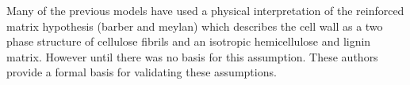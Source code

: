 Many of the previous models have used a physical interpretation of the
reinforced matrix hypothesis (barber and meylan) which describes the cell wall
as a two phase structure of cellulose fibrils and an isotropic hemicellulose and
lignin matrix. However until \cite{Yamamoto_2007} there was
no basis for this assumption. These authors provide a formal basis for validating
these assumptions.